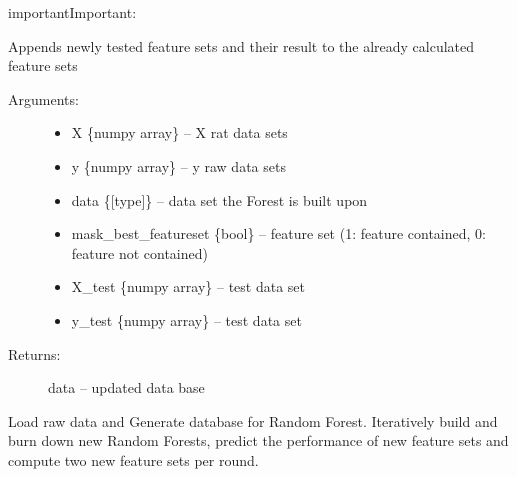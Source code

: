 \documentclass[letterpaper,10pt,english]{sphinxmanual}
\begin{document}
\begin{sphinxadmonition}{important}{Important:}
\label{\detokenize{Update_Database:update-database-fun}}

\begin{fulllineitems}
\label{\detokenize{Update_Database:ForestFire.Main.update_database}}
Appends newly tested feature sets and their result to the already calculated feature sets
\begin{description}
\item[{Arguments:}] \leavevmode\begin{itemize}
\item {} 
X \{numpy array\} -- X rat data sets

\item {} 
y \{numpy array\} -- y raw data sets

\item {} 
data \{{[}type{]}\} -- data set the Forest is built upon

\item {} 
mask\_best\_featureset \{bool\} -- feature set (1: feature contained, 0: feature not contained)

\item {} 
X\_test \{numpy array\} -- test data set

\item {} 
y\_test \{numpy array\} -- test data set

\end{itemize}

\item[{Returns:}] \leavevmode
data -- updated data base

\end{description}

\end{fulllineitems}



\begin{fulllineitems}
Load raw data and Generate database for Random Forest. Iteratively build and burn down new Random Forests, predict the performance of new feature sets and compute two new feature sets per round.


\end{fulllineitems}
\end{sphinxadmonition}
\end{document}
